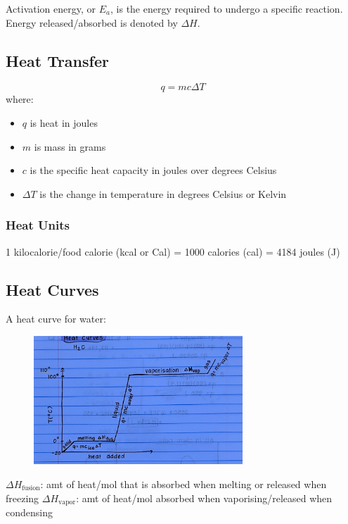 \documentclass[a4paper, 12pt]{article}
\begin{document}
Activation energy, or \(E_a\), is the energy required to undergo a specific reaction. Energy released/absorbed is denoted by \(\Delta H\).

\subsection{Heat Transfer}

\begin{equation}\label{heattransfer}
q = mc \Delta T
\end{equation}
where:
\begin{itemize}[leftmargin=*, nosep]
\item $q$ is heat in joules
\item $m$ is mass in grams
\item $c$ is the specific heat capacity in joules over degrees Celsius
\item $\Delta T$ is the change in temperature in degrees Celsius or Kelvin
\end{itemize}

\subsubsection{Heat Units}

1 kilocalorie/food calorie (kcal or Cal) = 1000 calories (cal) = 4184 joules (J)

\subsection{Heat Curves}
A heat curve for water:

\begin{figure}[H]
\centering
\includegraphics[width=0.7\textwidth]{heatcurve.jpg}
\end{figure}

$\Delta H_\text{fusion}$: amt of heat/mol that is absorbed when melting or released when freezing
$\Delta H_\text{vapor}$: amt of heat/mol absorbed when vaporising/released when condensing
\end{document}
